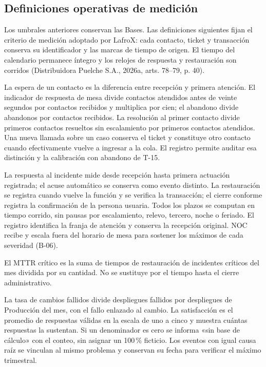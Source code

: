 \subsection*{Definiciones operativas de medición}
Los umbrales anteriores conservan las Bases. Las definiciones siguientes fijan el criterio de medición adoptado por LafroX: cada contacto, ticket y transacción conserva su identificador y las marcas de tiempo de origen. El tiempo del calendario permanece íntegro y los relojes de respuesta y restauración son corridos (Distribuidora Puelche S.A., 2026a, arts. 78--79, p. 40).

La espera de un contacto es la diferencia entre recepción y primera atención. El indicador de respuesta de mesa divide contactos atendidos antes de veinte segundos por contactos recibidos y multiplica por cien; el abandono divide abandonos por contactos recibidos. La resolución al primer contacto divide primeros contactos resueltos sin escalamiento por primeros contactos atendidos. Una nueva llamada sobre un caso conserva el ticket y constituye otro contacto cuando efectivamente vuelve a ingresar a la cola. El registro permite auditar esa distinción y la calibración con abandono de T-15.

La respuesta al incidente mide desde recepción hasta primera actuación registrada; el acuse automático se conserva como evento distinto. La restauración se registra cuando vuelve la función y se verifica la transacción; el cierre conforme registra la confirmación de la persona usuaria. Todos los plazos se computan en tiempo corrido, sin pausas por escalamiento, relevo, tercero, noche o feriado. El registro identifica la franja de atención y conserva la recepción original. NOC recibe y escala fuera del horario de mesa para sostener los máximos de cada severidad (B-06).

El MTTR crítico es la suma de tiempos de restauración de incidentes críticos del mes dividida por su cantidad. No se sustituye por el tiempo hasta el cierre administrativo.

La tasa de cambios fallidos divide despliegues fallidos por despliegues de Producción del mes, con el fallo enlazado al cambio. La satisfacción es el promedio de respuestas válidas en la escala de uno a cinco y muestra cuántas respuestas la sustentan. Si un denominador es cero se informa «sin base de cálculo» con el conteo, sin asignar un 100\,\% ficticio. Los eventos con igual causa raíz se vinculan al mismo problema y conservan su fecha para verificar el máximo trimestral.


